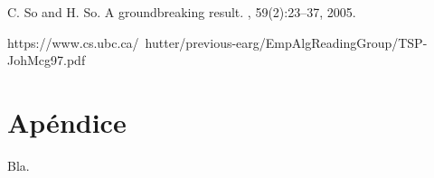 \documentclass{ci5652}
\begin{document}
\begin{thebibliography}{99}

C. So and H. So.
\newblock A groundbreaking result.
, 59(2):23--37, 2005.

\bibitem{}
  \newblock https://www.cs.ubc.ca/~hutter/previous-earg/EmpAlgReadingGroup/TSP-JohMcg97.pdf

\end{thebibliography}

\newpage
\section*{Apéndice}

Bla.
\end{document}
